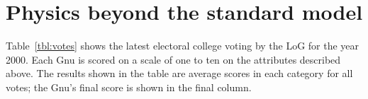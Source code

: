 \section{Physics beyond the standard model}
\label{sec:BSM}

Table~\ref{tbl:votes} shows the latest electoral college voting by the
LoG for the year 2000.  Each Gnu is scored on a scale of one to ten on
the attributes described above.  The results shown in the table are
average scores in each category for all votes; the Gnu's final score
is shown in the final column.

%
%

